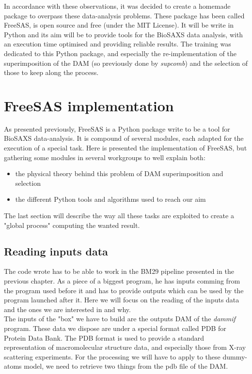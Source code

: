 \documentclass[a4paper, 11pt]{report}
\begin{document}
In accordance with these observations, it was decided to create a 
homemade package to overpass these data-analysis problems. 
These package has been called FreeSAS, is open source and free (under 
the MIT License). 
It will be write in Python and its aim will be to provide tools for 
the BioSAXS data analysis, with an execution time optimised and 
providing reliable results. 
The training was dedicated to this Python package, and especially the 
re-implementation of the superimposition of the DAM (so previously 
done by \textit{supcomb}) and the selection of those to keep along the 
process.


\chapter{FreeSAS implementation}%


As presented previously, FreeSAS is a Python package write to be a 
tool for BioSAXS data-analysis. 
It is compound of several modules, each adapted for the execution of a 
special task. 
Here is presented the implementation of FreeSAS, but gathering some 
modules in several workgroups to well explain both:
\begin{itemize}
 \item the physical theory behind this problem of DAM superimposition 
and selection
 \item the different Python tools and algorithms used to reach our aim
\end{itemize}

The last section will describe the way all these tasks are exploited 
to create a "global process" computing the wanted result. 

\section{Reading inputs data}

The code wrote has to be able to work in the BM29 pipeline presented 
in the previous chapter. 
As a piece of a biggest program, he has inputs comming from the 
program used before it and has to provide outputs which can be used by 
the program launched after it. 
Here we will focus on the reading of the inputs data and the ones we  
are interested in and why.\\

The inputs of the "box" we have to build are the outputs DAM of the 
\textit{dammif} program. 
These data we dispose are under a special format called PDB for 
Protein Data Bank. %
The PDB format is used to provide a standard representation of 
macromolecular structure data, and especially those from X-ray 
scattering experiments. 
For the processing we will have to apply to these dummy-atoms model, 
we need to retrieve two things from the pdb file of the DAM.\\
\end{document}
